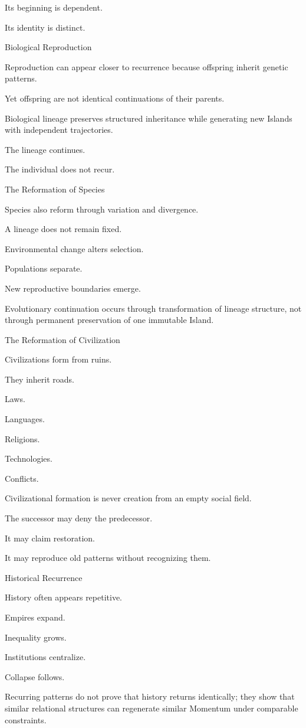 Its beginning is dependent.

Its identity is distinct.

Biological Reproduction

Reproduction can appear closer to recurrence because offspring inherit genetic patterns.

Yet offspring are not identical continuations of their parents.

Biological lineage preserves structured inheritance while generating new Islands with independent trajectories.

The lineage continues.

The individual does not recur.

The Reformation of Species

Species also reform through variation and divergence.

A lineage does not remain fixed.

Environmental change alters selection.

Populations separate.

New reproductive boundaries emerge.

Evolutionary continuation occurs through transformation of lineage structure, not through permanent preservation of one immutable Island.

The Reformation of Civilization

Civilizations form from ruins.

They inherit roads.

Laws.

Languages.

Religions.

Technologies.

Conflicts.

Civilizational formation is never creation from an empty social field.

The successor may deny the predecessor.

It may claim restoration.

It may reproduce old patterns without recognizing them.

Historical Recurrence

History often appears repetitive.

Empires expand.

Inequality grows.

Institutions centralize.

Collapse follows.

Recurring patterns do not prove that history returns identically; they show that similar relational structures can regenerate similar Momentum under comparable constraints.

